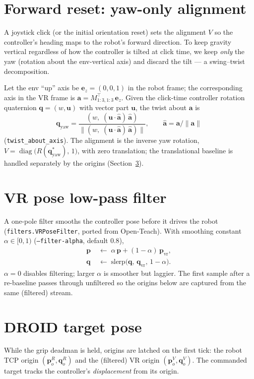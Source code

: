 \documentclass[11pt]{article}
\newcommand{\quat}[1]{\bm{#1}}
\newcommand{\vp}{\bm{p}}
\DeclareMathOperator{\diag}{diag}
\begin{document}
\section{Forward reset: yaw-only alignment}\label{sec:yaw}
A joystick click (or the initial orientation reset) sets the alignment $V$ so
the controller's heading maps to the robot's forward direction. To keep
gravity vertical regardless of how the controller is tilted at click time, we
keep \emph{only} the yaw (rotation about the env-vertical axis) and discard the
tilt --- a swing--twist decomposition.

Let the env ``up'' axis be $\bm{e}_z=(0,0,1)$ in the robot frame; the
corresponding axis in the VR frame is
$\bm{a} = M_{1:3,1:3}^{\top}\,\bm{e}_z$. Given the click-time controller
rotation quaternion $\quat{q}=(w,\bm{u})$ with vector part $\bm{u}$, the twist
about $\bm{a}$ is
\begin{equation}
  \quat{q}_{\text{yaw}} = \frac{(w,\;(\bm{u}\cdot\hat{\bm a})\,\hat{\bm a})}
       {\lVert (w,\;(\bm{u}\cdot\hat{\bm a})\,\hat{\bm a})\rVert},
  \qquad \hat{\bm a}=\bm{a}/\lVert\bm{a}\rVert
  \label{eq:twist}
\end{equation}
(\texttt{twist\_about\_axis}). The alignment is the inverse yaw rotation,
$V = \diag\!\big(R(\quat{q}_{\text{yaw}}^{*}),\,1\big)$, with zero translation;
the translational baseline is handled separately by the origins
(Section~\ref{sec:droid}).

\section{VR pose low-pass filter}\label{sec:filter}
A one-pole filter smooths the controller pose before it drives the robot
(\texttt{filters.VRPoseFilter}, ported from Open-Teach). With smoothing
constant $\alpha\in[0,1)$ (\texttt{--filter-alpha}, default $0.8$),
\begin{align}
  \vp \;&\leftarrow\; \alpha\,\vp + (1-\alpha)\,\vp_{\text{vr}}, \\
  \quat{q} \;&\leftarrow\; \mathrm{slerp}\!\big(\quat{q},\,\quat{q}_{\text{vr}},\,1-\alpha\big).
\end{align}
$\alpha=0$ disables filtering; larger $\alpha$ is smoother but laggier. The
first sample after a re-baseline passes through unfiltered so the origins
below are captured from the same (filtered) stream.

\section{DROID target pose}\label{sec:droid}
While the grip deadman is held, origins are latched on the first tick:
the robot TCP origin $(\vp_{o}^{R},\quat{q}_{o}^{R})$ and the (filtered) VR
origin $(\vp_{o}^{V},\quat{q}_{o}^{V})$. The commanded target tracks the
controller's \emph{displacement} from its origin.
\end{document}
